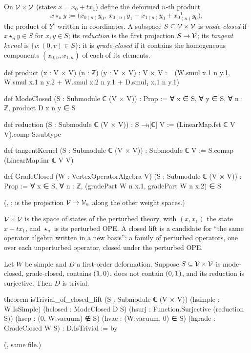\begin{definition}\label{l07:def:closedlift}
On $\mathcal{V}\times\mathcal{V}$ (states $x = x_0 + tx_1$) define the deformed $n$-th product
\begin{equation*}
 x\star_n y := \big(x_{0(n)}y_0,\ x_{0(n)}y_1 + x_{1(n)}y_0 + x_0{}^1_{(n)}y_0\big),
\end{equation*}
the product of $Y^t$ written in coordinates. A subspace $S\subseteq\mathcal{V}\times\mathcal{V}$ is \emph{mode-closed}
if $x\star_ny\in S$ for $x,y\in S$; its \emph{reduction} is the first projection $S\to\mathcal{V}$; its
\emph{tangent kernel} is $\{v : (0,v)\in S\}$; it is \emph{grade-closed} if it contains the homogeneous
components $(x_{0,n},x_{1,n})$ of each of its elements.
\end{definition}
\begin{leancode}
def product (x : V × V) (n : ℤ) (y : V × V) : V × V :=
  (W.smul x.1 n y.1,
    W.smul x.1 n y.2 + W.smul x.2 n y.1 + D.smul₁ x.1 n y.1)

def ModeClosed (S : Submodule ℂ (V × V)) : Prop :=
  ∀ x ∈ S, ∀ y ∈ S, ∀ n : ℤ, product D x n y ∈ S

def reduction (S : Submodule ℂ (V × V)) : S →ₗ[ℂ] V :=
  (LinearMap.fst ℂ V V).comp S.subtype

def tangentKernel (S : Submodule ℂ (V × V)) : Submodule ℂ V :=
  S.comap (LinearMap.inr ℂ V V)

def GradeClosed (W : VertexOperatorAlgebra V) (S : Submodule ℂ (V × V)) : Prop :=
  ∀ x ∈ S, ∀ n : ℤ, (gradePart W n x.1, gradePart W n x.2) ∈ S
\end{leancode}
(, ;
 is the projection $\mathcal{V}\to\mathcal{V}_n$ along the other weight spaces.)

\begin{physics}
$\mathcal{V}\times\mathcal{V}$ is the space of states of the perturbed theory, with $(x,x_1)$ the state $x+tx_1$, and $\star_n$ is
its perturbed OPE. A closed lift is a candidate for ``the same operator algebra written in a new basis'':
a family of perturbed operators, one over each unperturbed operator, closed under the perturbed OPE.
\end{physics}

\begin{theorem}\label{l07:thm:closedlift}
Let $W$ be simple and $D$ a first-order deformation. Suppose $S\subseteq\mathcal{V}\times\mathcal{V}$ is mode-closed,
grade-closed, contains $(\mathbf{1},0)$, does not contain $(0,\mathbf{1})$, and its reduction is surjective.
Then $D$ is trivial.
\end{theorem}
\begin{leancode}
theorem isTrivial_of_closed_lift (S : Submodule ℂ (V × V))
    (hsimple : W.IsSimple) (hclosed : ModeClosed D S)
    (hsurj : Function.Surjective (reduction S))
    (hsep : (0, W.vacuum) ∉ S) (hvac : (W.vacuum, 0) ∈ S)
    (hgrade : GradeClosed W S) : D.IsTrivial := by
\end{leancode}
(, same file.)

